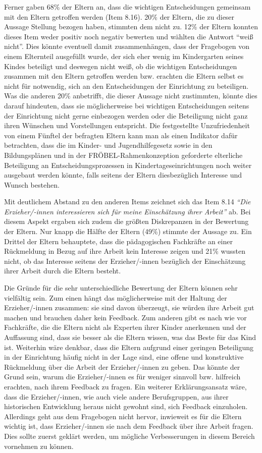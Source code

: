 \documentclass[12pt,a4paper]{article}
\begin{document}
	Ferner gaben 68\% der Eltern an, dass die wichtigen Entscheidungen gemeinsam mit den Eltern getroffen werden (Item 8.16). 20\% der Eltern, die zu dieser Aussage Stellung bezogen haben, stimmten dem nicht zu. 12\% der Eltern konnten dieses Item weder positiv noch negativ bewerten und wählten die Antwort "`weiß nicht"'. Dies könnte eventuell damit zusammenhängen, dass der Fragebogen von einem Elternteil ausgefüllt wurde, der sich eher wenig im Kindergarten seines Kindes beteiligt und deswegen nicht weiß, ob die wichtigen Entscheidungen zusammen mit den Eltern getroffen werden bzw. erachten die Eltern selbst es nicht für notwendig, sich an den Entscheidungen der Einrichtung zu beteiligen. Was die anderen 20\% anbetrifft, die dieser Aussage nicht zustimmten, könnte dies darauf hindeuten, dass sie möglicherweise bei wichtigen Entscheidungen seitens der Einrichtung nicht gerne einbezogen werden oder die Beteiligung nicht ganz ihren Wünschen und Vorstellungen entspricht. Die festgestellte Unzufriedenheit von einem Fünftel der befragten Eltern kann man als einen Indikator dafür betrachten, dass die im Kinder- und Jugendhilfegesetz sowie in den Bildungsplänen und in der FRÖBEL-Rahmenkonzeption geforderte elterliche Beteiligung an Entscheidungsprozessen in Kindertageseinrichtungen noch weiter ausgebaut werden könnte, falls seitens der Eltern diesbezüglich Interesse und Wunsch bestehen.
	
	Mit deutlichem Abstand zu den anderen Items zeichnet sich das Item 8.14 \textit{"`Die Erzieher/-innen interessieren sich für meine Einschätzung ihrer Arbeit"'} ab. Bei diesem Aspekt ergaben sich zudem die größten Diskrepanzen in der Bewertung der Eltern. Nur knapp die Hälfte der Eltern (49\%) stimmte der Aussage zu. Ein Drittel der Eltern behauptete, dass die pädagogischen Fachkräfte an einer Rückmeldung in Bezug auf ihre Arbeit kein Interesse zeigen und 21\% wussten nicht, ob das Interesse seitens der Erzieher/-innen bezüglich der Einschätzung ihrer Arbeit durch die Eltern besteht. 
	
Die Gründe für die sehr unterschiedliche Bewertung der Eltern können sehr vielfältig sein. Zum einen hängt das möglicherweise mit der Haltung der Erzieher/-innen zusammen: sie sind davon überzeugt, sie würden ihre Arbeit gut machen und brauchen daher kein Feedback. Zum anderen gibt es nach wie vor Fachkräfte, die die Eltern nicht als Experten ihrer Kinder anerkennen und der Auffassung sind, dass sie besser als die Eltern wissen, was das Beste für das Kind ist. Weiterhin wäre denkbar, dass die Eltern aufgrund einer geringen Beteiligung in der Einrichtung häufig nicht in der Lage sind, eine offene und konstruktive Rückmeldung über die Arbeit der Erzieher/-innen zu geben. Das könnte der Grund sein, warum die Erzieher/-innen es für weniger sinnvoll bzw. hilfreich erachten, nach ihrem Feedback zu fragen. Ein weiterer Erklärungsansatz wäre, dass die Erzieher/-innen, wie auch viele andere Berufsgruppen, aus ihrer historischen Entwicklung heraus nicht gewohnt sind, sich Feedback einzuholen. Allerdings geht aus dem Fragebogen nicht hervor, inwieweit es für die Eltern wichtig ist, dass Erzieher/-innen sie nach dem Feedback über ihre Arbeit fragen. Dies sollte zuerst geklärt werden, um mögliche Verbesserungen in diesem Bereich vornehmen zu können.
\end{document}
